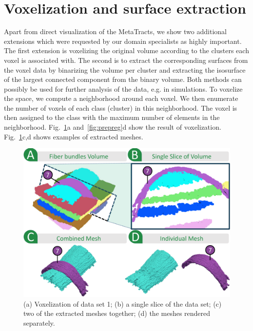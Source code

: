 \section {Voxelization and surface extraction}
\label{sec:vis}

Apart from direct visualization of the MetaTracts, we show two additional extensions which were requested by our domain specialists as highly important. The first extension is voxelizing the original volume according to the clusters each voxel is associated with.
The second is to extract the corresponding surfaces from the voxel data by binarizing the volume per cluster and extracting the isosurface of the largest connected component from the binary volume. Both methods can possibly be used for further analysis of the data, e.g. in simulations.
%
To voxelize the space,  we compute a neighborhood around each voxel. We then enumerate the number of voxels of each class (cluster) in this neighborhood. The voxel is then assigned to the class with the maximum number of elements in the neighborhood. Fig.~\ref{fig:crop-16-decomp}a and~\ref{fig:prepreg}d show the result of voxelization. Fig.~\ref{fig:crop-16-decomp}c,d shows examples of extracted meshes.

\begin{figure}
\centering
		\includegraphics[width=\linewidth]{images_pvis/figure8.pdf}
	\caption{(a) Voxelization of data set 1; (b) a single slice of the data set; (c) two of the extracted meshes together; (d) the meshes rendered separately.}
	\label{fig:crop-16-decomp}
\end{figure}  


